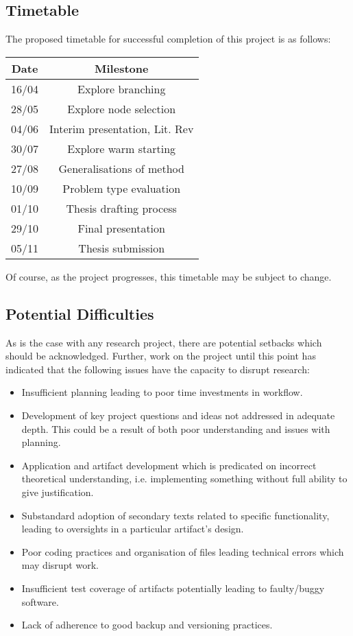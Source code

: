 \documentclass[12pt, a4paper]{article}
\begin{document}
\subsection{Timetable}
The proposed timetable for successful completion of this project is as follows:

\begin{center}
  \begin{tabular}{||c | c||}
  \hline
  Date & Milestone \\ [0.5ex]
  \hline\hline
  16/04 & Explore branching \\
  \hline
  28/05 & Explore node selection \\
  \hline
  04/06 & Interim presentation, Lit. Rev  \\
  \hline
  30/07 & Explore warm starting \\
  \hline
  27/08 & Generalisations of method \\
  \hline
  10/09 & Problem type evaluation \\
  \hline
  01/10 & Thesis drafting process \\
  \hline
  29/10 & Final presentation \\
  \hline 
  05/11 & Thesis submission \\ [1ex]
  \hline
  \end{tabular}
\end{center}

Of course, as the project progresses, this timetable may be subject to change.

\subsection{Potential Difficulties}
As is the case with any research project, there are potential setbacks which should be acknowledged. Further, work on the project until this point has indicated that the following issues have the capacity to disrupt research:
\begin{itemize}
  \item Insufficient planning leading to poor time investments in workflow.
  \item Development of key project questions and ideas not addressed in adequate depth. This could be a result of both poor understanding and issues with planning.
  \item Application and artifact development which is predicated on incorrect theoretical understanding, i.e. implementing something without full ability to give justification.
  \item Substandard adoption of secondary texts related to specific functionality, leading to oversights in a particular artifact's design.
  \item Poor coding practices and organisation of files leading technical errors which may disrupt work.
  \item Insufficient test coverage of artifacts potentially leading to faulty/buggy software.
  \item Lack of adherence to good backup and versioning practices. 
\end{itemize}
\end{document}
